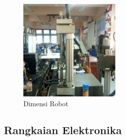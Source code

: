 \begin{figure}[H]
	\centering
	\includegraphics[width=5cm]{gambar/penuamticsementara.jpg}
	\caption{Dimensi Robot}
\end{figure}

\subsection{Rangkaian Elektronika}
